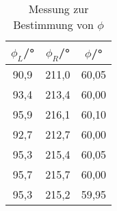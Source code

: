 \begin{table}[h!]
  \centering
  \caption{Messung zur Bestimmung von $\phi$}
  \label{tab:phi}
  \begin{tabular}{c c c}
    \toprule
      $\phi_L$/° & $\phi_R$/°  & $\phi$/° \\
    \midrule


90,9	&211,0	&60,05\\
93,4	&213,4	&60,00\\
95,9	&216,1	&60,10\\
92,7	&212,7	&60,00\\
95,3	&215,4	&60,05\\
95,7	&215,7	&60,00\\
95,3	&215,2	&59,95\\


    \bottomrule
  \end{tabular}
\end{table}
